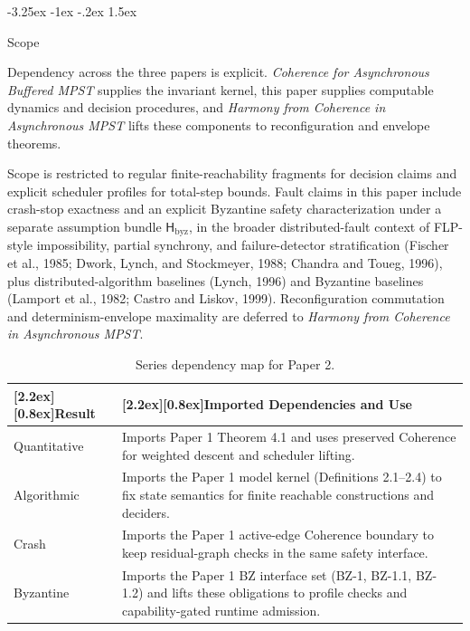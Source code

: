 \documentclass[a4paper,10pt,twocolumn,english]{article}
\makeatletter
\renewcommand{\subsection}{\@startsection{subsection}{2}{\z@}%
  {-3.25ex \@plus -1ex \@minus -.2ex}%
  {1.5ex}%
  {\raggedright\normalfont\normalsize\bfseries}}
\numberwithin{equation}{section}
\theoremstyle{paperdef}
\theoremstyle{paperplain}
\theoremstyle{paperdef}
\theoremstyle{paperremark}
\newcommand{\thead}[1]{\textbf{\raisebox{0pt}[2.2ex][0.8ex]{#1}}}
\newcommand{\Hbyz}{\ensuremath{\mathsf{H}_{\mathrm{byz}}}}
\makeatother
\begin{document}
\subsection{Scope}

Dependency across the three papers is explicit. \emph{Coherence for Asynchronous Buffered MPST}
supplies the invariant kernel, this paper supplies computable dynamics and decision procedures, and
\emph{Harmony from Coherence in Asynchronous MPST} lifts these components to reconfiguration and
envelope theorems.

Scope is restricted to regular finite-reachability fragments for decision claims and explicit
scheduler profiles for total-step bounds. Fault claims in this paper include crash-stop exactness
and an explicit Byzantine safety characterization under a separate assumption bundle \Hbyz, in
the broader distributed-fault context of FLP-style impossibility, partial synchrony, and
failure-detector stratification (Fischer et al., 1985; Dwork, Lynch, and Stockmeyer, 1988; Chandra
and Toueg, 1996), plus distributed-algorithm baselines (Lynch, 1996) and Byzantine baselines
(Lamport et al., 1982; Castro and Liskov, 1999). Reconfiguration commutation and determinism-envelope
maximality are deferred to \emph{Harmony from Coherence in Asynchronous MPST}.

\begin{table}[H]
	\centering
	\scriptsize
	\begin{tabularx}{\columnwidth}{@{}L{0.23\columnwidth}L{0.72\columnwidth}@{}}
		\toprule
		\thead{Result} & \thead{Imported Dependencies and Use}                                                                                                             \\
		\midrule
		Quantitative   & Imports Paper 1 Theorem 4.1 and uses preserved Coherence for weighted descent and scheduler lifting.                                              \\
		Algorithmic    & Imports the Paper 1 model kernel (Definitions 2.1--2.4) to fix state semantics for finite reachable constructions and deciders.                   \\
		Crash          & Imports the Paper 1 active-edge Coherence boundary to keep residual-graph checks in the same safety interface.                                    \\
		Byzantine      & Imports the Paper 1 BZ interface set (BZ-1, BZ-1.1, BZ-1.2) and lifts these obligations to profile checks and capability-gated runtime admission. \\
		\bottomrule
	\end{tabularx}
	\caption{Series dependency map for Paper 2.}
	\label{tab:p2-series-dependencies}
\end{table}
\end{document}
